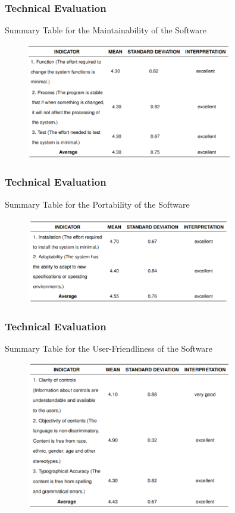 \documentclass{beamer}
\begin{document}
\begin{frame}
	\frametitle{Technical Evaluation}
	\begin{block}{Summary Table for the Maintainability of the Software}
		\begin{figure}
			\includegraphics[width=0.8\textwidth]{figures/res_tech_maintainability.png}
		\end{figure}
	\end{block}
\end{frame}

\begin{frame}
	\frametitle{Technical Evaluation}
	\begin{block}{Summary Table for the Portability of the Software}
		\begin{figure}
			\includegraphics[width=0.8\textwidth]{figures/res_tech_portability.png}
		\end{figure}
	\end{block}
\end{frame}

\begin{frame}
	\frametitle{Technical Evaluation}
	\begin{block}{Summary Table for the User-Friendliness of the Software}
		\begin{figure}
			\includegraphics[width=0.8\textwidth]{figures/res_tech_uf.png}
		\end{figure}
	\end{block}
\end{frame}
\end{document}
